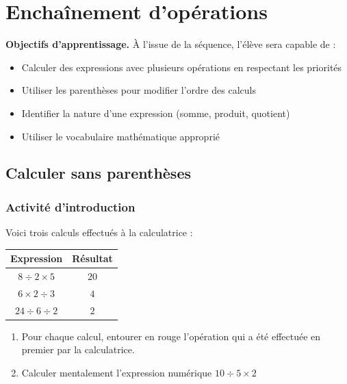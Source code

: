 \chapter{Enchaînement d'opérations}

\begin{objectifsbox}
\textbf{Objectifs d'apprentissage.} À l'issue de la séquence, l'élève sera capable de :
\begin{itemize}
\item Calculer des expressions avec plusieurs opérations en respectant les priorités
\item Utiliser les parenthèses pour modifier l'ordre des calculs
\item Identifier la nature d'une expression (somme, produit, quotient)
\item Utiliser le vocabulaire mathématique approprié
\end{itemize}
\end{objectifsbox}

\section{Calculer sans parenthèses}

\subsection{Activité d'introduction}

\begin{activitybox}
Voici trois calculs effectués à la calculatrice :

\begin{center}
\begin{tabular}{|c|c|}
\hline
\textbf{Expression} & \textbf{Résultat} \\
\hline
$8 \div 2 \times 5$ & $20$ \\
\hline
$6 \times 2 \div 3$ & $4$ \\
\hline
$24 \div 6 \div 2$ & $2$ \\
\hline
\end{tabular}
\end{center}

\begin{enumerate}[label=\alph*)]
\item Pour chaque calcul, entourer en rouge l'opération qui a été effectuée en premier par la calculatrice.
\item Calculer mentalement l'expression numérique $10 \div 5 \times 2$
\end{enumerate}
\end{activitybox}

